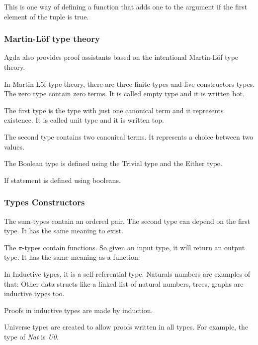   This is one way of defining a function that adds one to the argument
  if the first element of the tuple is true.


  \subsubsection{Martin-Löf type theory}
  Agda also provides proof assistants based on the intentional Martin-Löf type theory.

    In Martin-Löf type theory, there are three finite types and five constructors types.
    The zero type contain zero terms. It is called empty type and it is written bot.

    The first type is the type with just one canonical term and it represents existence.
    It is called unit type and it is written top.

    The second type contains two canonical terms. It represents a choice between two values.

    The Boolean type is defined using the Trivial type and the Either type.

    If statement is defined using booleans.


    \subsubsection{Types Constructors}
    The sum-types contain an ordered pair.
    The second type can depend on the first type.
    It has the same meaning to exist.

    The $\pi$-types contain functions.
    So given an input type, it will return an output type.
    It has the same meaning as a function:

    In Inductive types, it is a self-referential type.
    Naturals numbers are examples of that:
    Other data structs like a linked list of natural numbers, trees, graphs are inductive types too.

    Proofs in inductive types are made by induction.

    Universe types are created to allow proofs written in all types.
    For example, the type of \emph{Nat} is \emph{U0}.



